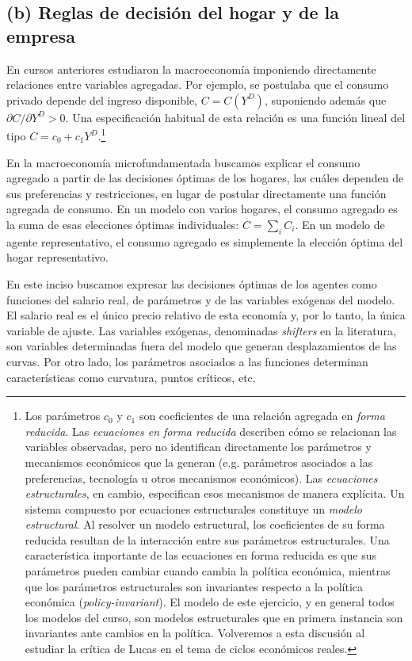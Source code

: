 \documentclass[11pt]{article}
\begin{document}
\subsection*{(b) Reglas de decisión del hogar y de la empresa}

En cursos anteriores estudiaron la macroeconomía imponiendo directamente relaciones entre variables agregadas. Por ejemplo, se postulaba que el consumo privado depende del ingreso disponible, \(C=C(Y^D)\), suponiendo además que \(\partial C/\partial Y^D>0\). Una especificación habitual de esta relación es una función lineal del tipo $C=c_0+c_1Y^D.$\footnote{Los parámetros \(c_0\) y \(c_1\) son coeficientes de una relación agregada en \textit{forma reducida}. Las \textit{ecuaciones en forma reducida} describen cómo se relacionan las variables observadas, pero no identifican directamente los parámetros y mecanismos económicos que la generan (e.g. parámetros asociados a las preferencias, tecnología u otros mecanismos económicos). Las \textit{ecuaciones estructurales}, en cambio, especifican esos mecanismos de manera explícita. Un sistema compuesto por ecuaciones estructurales constituye un \textit{modelo estructural}. Al resolver un modelo estructural, los coeficientes de su forma reducida resultan de la interacción entre sus parámetros estructurales. Una característica importante de las ecuaciones en forma reducida es que sus parámetros pueden cambiar cuando cambia la política económica, mientras que los parámetros estructurales son invariantes respecto a la política económica (\textit{policy-invariant}). El modelo de este ejercicio, y en general todos los modelos del curso, son modelos estructurales que en primera instancia son invariantes ante cambios en la política. Volveremos a esta discusión al estudiar la crítica de Lucas en el tema de ciclos económicos reales.}

En la macroeconomía microfundamentada buscamos explicar el consumo agregado a partir de las decisiones óptimas de los hogares, las cuáles dependen de sus preferencias y restricciones, en lugar de postular directamente una función agregada de consumo. En un modelo con varios hogares, el consumo agregado es la suma de esas elecciones óptimas individuales: \(C=\sum_i C_i\). En un modelo de agente representativo, el consumo agregado es simplemente la elección óptima del hogar representativo.



En este inciso buscamos expresar las decisiones óptimas de los agentes como funciones del salario real, de parámetros y de las variables exógenas del modelo. El salario real es el único precio relativo de esta economía y, por lo tanto, la única variable de ajuste. Las variables exógenas, denominadas \textit{shifters} en la literatura, son variables determinadas fuera del modelo que generan desplazamientos de las curvas. Por otro lado, los parámetros asociados a las funciones determinan características como curvatura, puntos críticos, etc.
\end{document}
